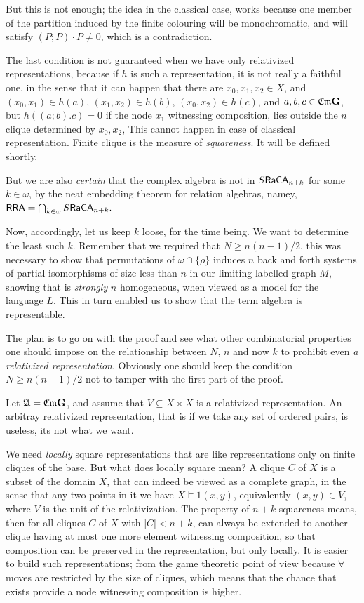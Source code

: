 \documentclass[12pt]{article}
\theoremstyle{definition}
\def\A{{\mathfrak{A}}}
\def\CA{{\sf CA}}
\def\RRA{{\bf RRA}}
\def\CA{{\sf CA}}
\def\G{{\sf G}}
\def\Cm{{\mathfrak{Cm}}}
\def\Ra{{\mathfrak{Ra}}}
\def\Ra{{\mathfrak{Ra}}}
\def\A{{\mathfrak{A}}}
\def\A{{\mathfrak{A}}}
\def\CA{{\sf CA}}
\def\RRA{{\sf RRA}}
\def\G{{\bf G}}
\def\Ra{{\sf Ra}}
\begin{document}
But this is not enough; the idea in the classical case,
works because  one member of the partition induced by the finite colouring will be monochromatic, 
and will satisfy $(P;P)\cdot P\neq 0$, which is a contradiction.

The last condition is not guaranteed  when we have only relativized representations, because if $h$ 
is such a representation, it is not really a faithful one, in the sense that it can happen that there are $x_0, x_1,x_2\in X$,
and $(x_0,x_1)\in h(a)$, $(x_1, x_2)\in h(b)$, $(x_0, x_2)\in h(c)$, and $a, b, c\in \Cm\G$,  but $h((a;b).c)=0$
if the node $x_1$ witnessing composition, lies outside the $n$ clique determined by $x_0, x_2$,
This cannot happen in case of  classical representation. 
Finite clique is the measure of {\it squareness}. It will be defined shortly.

But we are also {\it certain } that the complex algebra is not in $S\Ra\CA_{n+k}$ for some $k\in \omega$, by the neat embedding 
theorem for relation algebras, namey,  
$\RRA=\bigcap_{k\in \omega}S\Ra\CA_{n+k}.$ 

Now, accordingly, let us keep $k$ loose, for the time being. We want to determine the least such $k$.
Remember that we required that $N\geq n(n-1)/2$, this was necessary to show that permutations of $\omega\cap \{\rho\}$ 
induces $n$ back and forth systems of partial isomorphisms of size less than $n$ in  our limiting labelled graph $M$, showing that is 
{\it strongly}
$n$ homogeneous, when viewed as a model for the language $L$. This in turn enabled us to show
that the term algebra is representable. 

The plan is to go on with the proof and see what other combinatorial properties one should impose on the relationship between
$N$, $n$ and now $k$ to prohibit even {\it a relativized representation}. 
Obviously one should  keep the condition $N\geq n(n-1)/2$ not to tamper with the
first part of the proof.

Let $\A=\Cm\G$, and assume that $V\subseteq X\times X$ is a relativized representation. 
An arbitray relativized representation, 
that is if we take any set of ordered pairs, is useless, its not what we want.

We need {\it locally} square representations that are like representations only on finite cliques of the base.
But what does locally square mean? 
A clique $C$ of $X$ is a subset of the domain $X$, that can indeed be viewed as a complete graph, in the sense that any two points in it
we have $X\models 1(x,y)$, equivalently $(x,y)\in V$, where $V$ is the unit of the relativization.
The property of $n+k$ squareness means, then for all cliques $C$ of $X$ with $|C|<n+k$, can always be extended to another clique 
having at most one more element witnessing composition, so that composition can be preserved in the representation,
but only locally. It is easier to build such representations; from the game theoretic point of view because $\forall$ 
moves are restricted by the size of cliques, which means
that the chance that exists provide a node witnessing composition is higher.
\end{document}
